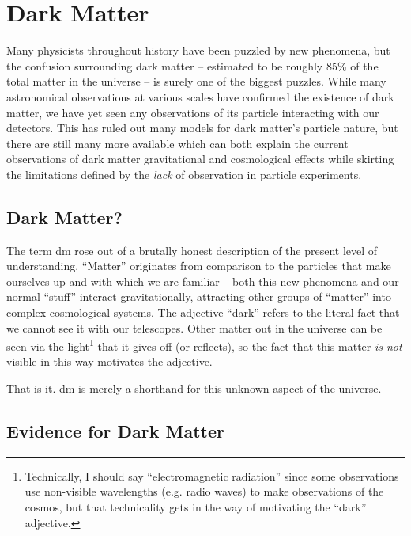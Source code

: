\chapter{Dark Matter}
\label{chapter:dm}

Many physicists throughout history have been puzzled by new phenomena, but the confusion
surrounding dark matter -- estimated to be roughly 85\% of the total matter in the universe -- is
surely one of the biggest puzzles. While many astronomical observations at various scales have
confirmed the existence of dark matter, we have yet seen any observations of its particle
interacting with our detectors. This has ruled out many models for dark matter's particle nature,
but there are still many more available which can both explain the current observations of dark
matter gravitational and cosmological effects while skirting the limitations defined by the
\emph{lack} of observation in particle experiments.

\section{Dark Matter?}
The term \ac{dm} rose out of a brutally honest description of the present level of understanding.
``Matter'' originates from comparison to the particles that make ourselves up and
with which we are familiar -- both this new phenomena and our normal ``stuff'' interact gravitationally, 
attracting other groups of ``matter'' into complex cosmological systems.
The adjective ``dark'' refers to the literal fact that we cannot
see it with our telescopes. Other matter out in the universe can be seen via the light\footnote{
  Technically, I should say ``electromagnetic radiation'' since some observations use non-visible
  wavelengths (e.g. radio waves) to make observations of the cosmos, but that technicality gets in
  the way of motivating the ``dark'' adjective. } that it gives off (or reflects), so the fact that
this matter \emph{is not} visible in this way motivates the adjective.

That is it. \ac{dm} is merely a shorthand for this unknown aspect of the universe.

\section{Evidence for Dark Matter}
\label{sec:dm:evidence}

